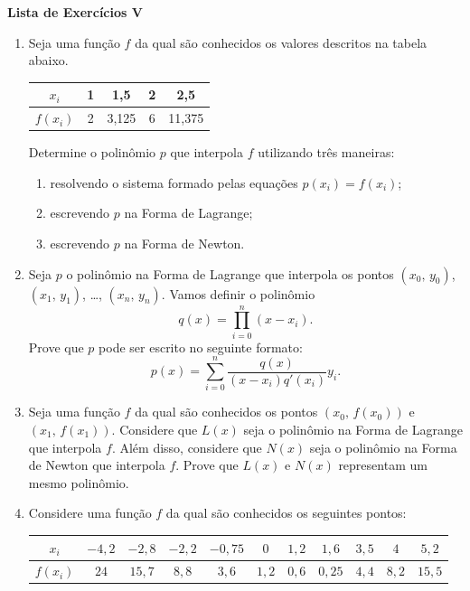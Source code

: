 \documentclass[12pt,a4paper]{article}
\begin{document}
\begin{center}
 \textbf{Lista de Exercícios V}
\end{center}

\begin{enumerate}
  
  \item Seja uma função $f$ da qual são conhecidos os valores descritos na tabela abaixo.
\begin{center}
 \begin{tabular}{c|c|c|c|c}
  $x_i$ & 1 & 1,5 & 2 & 2,5\\ \hline
  $f(x_i)$ & 2 & 3,125 & 6 & 11,375
 \end{tabular}
\end{center}

  Determine o polinômio $p$ que interpola $f$ utilizando três maneiras:
  \begin{enumerate}
   \item resolvendo o sistema formado pelas equações $p(x_i) = f(x_i)$;
   \item escrevendo $p$ na Forma de Lagrange;
   \item escrevendo $p$ na Forma de Newton.
  \end{enumerate}

  \item Seja $p$ o polinômio na Forma de Lagrange que interpola os pontos $(x_0,\,y_0)$, $(x_1,\,y_1)$, \ldots, $(x_n,\,y_n)$. Vamos definir o 
polinômio $$q(x) = \prod_{i=0}^{n} (x-x_i).$$ Prove que $p$ pode ser escrito no seguinte formato: 
$$p(x) = \sum_{i=0}^n\frac{q(x)}{(x-x_i)q'(x_i)}y_i.$$

  \item Seja uma função $f$ da qual são conhecidos os pontos $(x_0,\,f(x_0))$ e $(x_1,\,f(x_1))$. Considere que 
$L(x)$ seja o polinômio na Forma de Lagrange que interpola $f$. Além disso, considere que $N(x)$ seja o polinômio na Forma de Newton que 
interpola $f$. Prove que $L(x)$ e $N(x)$ representam um mesmo polinômio.

  \item Considere uma função $f$ da qual são conhecidos os seguintes pontos:

   \begin{center}
   \begin{tabular}{c|c|c|c|c|c|c|c|c|c|c}
      $x_i$ & $-4,2$ & $-2,8$ & $-2,2$ & $-0,75$ & $0$ & $1,2$ & $1,6$ & $3,5$ & $4$ & $5,2$\\ \hline
      $f(x_i)$ & $24$ & $15,7$ & $8,8$ & $3,6$ & $1,2$ & $0,6$ & $0,25$ & $4,4$ & $8,2$ & $15,5$
   \end{tabular}
   \end{center}


\end{enumerate}
\end{document}
